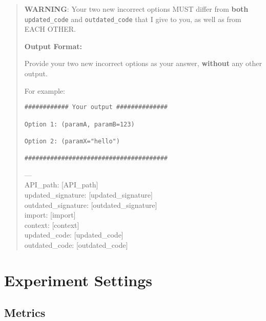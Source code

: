 \begin{tcolorbox}[breakable, colback=gray!5!white,width=\linewidth, left=-3mm, right=-3mm, top=1mm, bottom=1mm, center]
\begin{quote}
{\textbf{WARNING}: Your two new incorrect options MUST differ from \textbf{both} \texttt{updated\_code} and \texttt{outdated\_code} that I give to you, as well as from EACH OTHER.

\textbf{Output Format:}

Provide your two new incorrect options as your answer, \textbf{without} any other output.

For example:
\begin{verbatim}
############ Your output ##############

Option 1: (paramA, paramB=123)

Option 2: (paramX="hello")

#######################################
\end{verbatim}
---\\
API\_path: {[API\_path]}\\
updated\_signature: {[updated\_signature]}\\
outdated\_signature: {[outdated\_signature]}\\
import: {[import]}\\
context: {[context]}\\
updated\_code: {[updated\_code]}\\
outdated\_code: {[outdated\_code]}\\
}
\end{quote}
\end{tcolorbox}

\clearpage
\section{Experiment Settings}

\subsection{Metrics}
\label{metrics}
